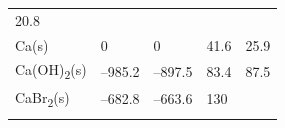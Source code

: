 \documentclass[
  9pt,
]{extbook}
\theoremstyle{definition}
\theoremstyle{definition}
\theoremstyle{definition}
\theoremstyle{remark}
\begin{document}
\begin{longtable}[]{@{}lllll@{}}
\begin{minipage}[t]{0.18\columnwidth}
20.8\strut
\end{minipage}\tabularnewline
\begin{minipage}[t]{0.10\columnwidth}\raggedright
Ca(s)\strut
\end{minipage} & \begin{minipage}[t]{0.19\columnwidth}\raggedright
0\strut
\end{minipage} & \begin{minipage}[t]{0.20\columnwidth}\raggedright
0\strut
\end{minipage} & \begin{minipage}[t]{0.18\columnwidth}\raggedright
41.6\strut
\end{minipage} & \begin{minipage}[t]{0.18\columnwidth}\raggedright
25.9\strut
\end{minipage}\tabularnewline
\begin{minipage}[t]{0.10\columnwidth}\raggedright
Ca(OH)\textsubscript{2}(s)\strut
\end{minipage} & \begin{minipage}[t]{0.19\columnwidth}\raggedright
--985.2\strut
\end{minipage} & \begin{minipage}[t]{0.20\columnwidth}\raggedright
--897.5\strut
\end{minipage} & \begin{minipage}[t]{0.18\columnwidth}\raggedright
83.4\strut
\end{minipage} & \begin{minipage}[t]{0.18\columnwidth}\raggedright
87.5\strut
\end{minipage}\tabularnewline
\begin{minipage}[t]{0.10\columnwidth}\raggedright
CaBr\textsubscript{2}(s)\strut
\end{minipage} & \begin{minipage}[t]{0.19\columnwidth}\raggedright
--682.8\strut
\end{minipage} & \begin{minipage}[t]{0.20\columnwidth}\raggedright
--663.6\strut
\end{minipage} & \begin{minipage}[t]{0.18\columnwidth}\raggedright
130\strut
\end{minipage} & \begin{minipage}[t]{0.18\columnwidth}\raggedright
\strut
\end{minipage}\tabularnewline
\begin{minipage}[t]{0.10\columnwidth}\raggedright

\end{minipage}
\end{longtable}
\end{document}
